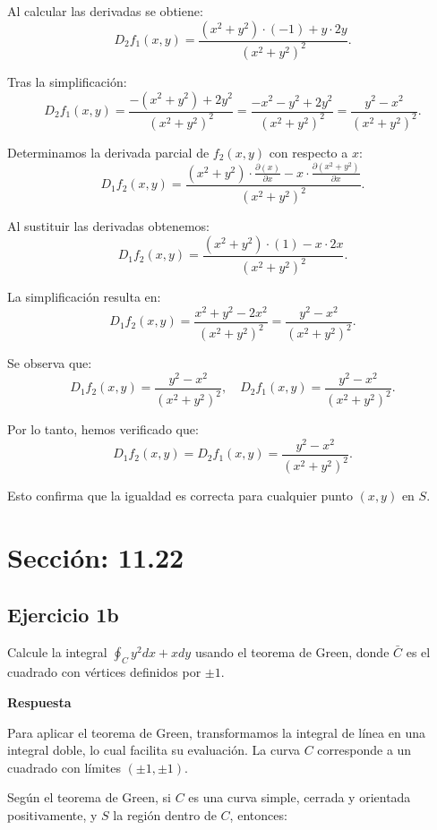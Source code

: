 \documentclass{report}
\begin{document}
Al calcular las derivadas se obtiene:
\[
D_2 f_1(x, y) = \frac{\left(x^2 + y^2\right) \cdot (-1) + y \cdot 2y}{\left(x^2 + y^2\right)^2}.
\]

Tras la simplificación:
\[
D_2 f_1(x, y) = \frac{-\left(x^2 + y^2\right) + 2y^2}{\left(x^2 + y^2\right)^2} = \frac{-x^2 - y^2 + 2y^2}{\left(x^2 + y^2\right)^2} = \frac{y^2 - x^2}{\left(x^2 + y^2\right)^2}.
\]



Determinamos la derivada parcial de \(f_2(x, y)\) con respecto a \(x\):
\[
D_1 f_2(x, y) = \frac{\left(x^2 + y^2\right) \cdot \frac{\partial(x)}{\partial x} - x \cdot \frac{\partial(x^2 + y^2)}{\partial x}}{\left(x^2 + y^2\right)^2}.
\]

Al sustituir las derivadas obtenemos:
\[
D_1 f_2(x, y) = \frac{\left(x^2 + y^2\right) \cdot (1) - x \cdot 2x}{\left(x^2 + y^2\right)^2}.
\]

La simplificación resulta en:
\[
D_1 f_2(x, y) = \frac{x^2 + y^2 - 2x^2}{\left(x^2 + y^2\right)^2} = \frac{y^2 - x^2}{\left(x^2 + y^2\right)^2}.
\]



Se observa que:
\[
D_1 f_2(x, y) = \frac{y^2 - x^2}{\left(x^2 + y^2\right)^2}, \quad D_2 f_1(x, y) = \frac{y^2 - x^2}{\left(x^2 + y^2\right)^2}.
\]

Por lo tanto, hemos verificado que:
\[
D_1 f_2(x, y) = D_2 f_1(x, y) = \frac{y^2 - x^2}{\left(x^2 + y^2\right)^2}.
\]

Esto confirma que la igualdad es correcta para cualquier punto \((x, y)\) en \(S\).
\section*{\textcolor{color1122}{Sección: 11.22}}
\subsection*{Ejercicio 1b}
Calcule la integral $\oint_C y^2 d x + x d y$ usando el teorema de Green, donde $\bar{C}$ es el cuadrado con vértices definidos por $\pm 1$.

\textbf{Respuesta}

Para aplicar el teorema de Green, transformamos la integral de línea en una integral doble, lo cual facilita su evaluación. La curva \(C\) corresponde a un cuadrado con límites \((\pm 1, \pm 1)\).

Según el teorema de Green, si \(C\) es una curva simple, cerrada y orientada positivamente, y \(S\) la región dentro de \(C\), entonces:
\end{document}
